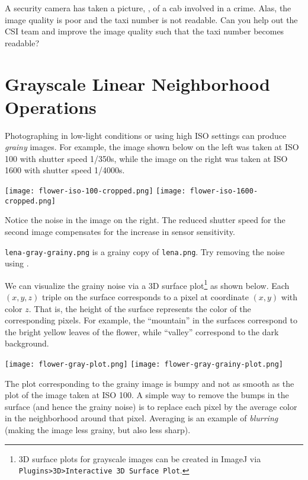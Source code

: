 \documentclass{book}
\begin{document}
\begin{exercise}
A security camera has taken a picture, , of a cab involved in a crime. Alas, the image quality is poor and the taxi number is not readable. Can you help out the CSI team and improve the image quality such that the taxi number becomes readable?
\end{exercise}

\section{Grayscale Linear Neighborhood Operations}
Photographing in low-light conditions or using high ISO settings can produce \emph{grainy} images. For example, the image shown below on the left was taken at ISO 100 with shutter speed 1/350s, while the image on the right was taken at ISO 1600 with shutter speed 1/4000s.
\begin{center}
\texttt{[image: flower-iso-100-cropped.png]}
\texttt{[image: flower-iso-1600-cropped.png]}
\end{center}

Notice the noise in the image on the right. The reduced shutter speed for the second image compensates for the increase in sensor sensitivity.
\begin{exercise}
\texttt{lena-gray-grainy.png} is a grainy copy of \texttt{lena.png}. Try removing the noise using .
\end{exercise}

We can visualize the grainy noise via a 3D surface plot\footnote{3D surface plots for grayscale images can be created in ImageJ via \texttt{Plugins>3D>Interactive 3D Surface Plot}.} as shown below. Each $(x, y, z)$ triple on the surface corresponds to a pixel at coordinate $(x, y)$ with color $z$. That is, the height of the surface represents the color of the corresponding pixels. For example, the ``mountain'' in the surfaces correspond to the bright yellow leaves of the flower, while ``valley'' correspond to the dark background.
\begin{center}
\texttt{[image: flower-gray-plot.png]}
\texttt{[image: flower-gray-grainy-plot.png]}
\end{center}
The plot corresponding to the grainy image is bumpy and not as smooth as the plot of the image taken at ISO 100. A simple way to remove the bumps in the surface (and hence the grainy noise) is to replace each pixel by the average color in the neighborhood around that pixel. Averaging is an example of \emph{blurring} (making the image less grainy, but also less sharp).
\end{document}
